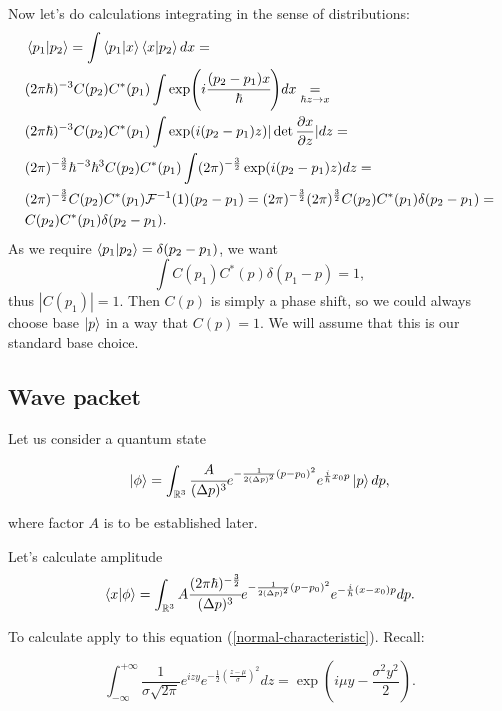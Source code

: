 \documentclass[main.tex]{subfiles}
\begin{document}
Now let's do calculations integrating in the sense of distributions:
\begin{align*}
& \bra{p_1}\ket{p_2} = \int\bra{p_1} \ket{x}\bra{x} \ket{p_2} dx = \\
& (2\pi\hbar)^{-3} C(p_2)C^*(p_1)\int \exp(i \cfrac{(p_2 - p_1)x}{\hbar})dx \underset{\hbar z\to x}{=} \\
& (2\pi\hbar)^{-3} C(p_2)C^*(p_1) \int \exp(i(p_2 - p_1)z) |\det \frac{\partial x}{\partial z}|dz
= \\ 
&(2\pi)^{-\frac{3}{2}} \hbar^{-3} \hbar^3 C(p_2)C^*(p_1) \int (2\pi)^{-\frac{3}{2}} \exp(i(p_2 - p_1)z)dz = \\ 
&(2\pi)^{-\frac{3}{2}} C(p_2)C^*(p_1) \mathcal{F}^{-1}(1)(p_2 - p_1) = (2\pi)^{-\frac{3}{2}} (2\pi)^{\frac{3}{2}} C(p_2)C^*(p_1) \delta(p_2 - p_1) = \\
& C(p_2)C^*(p_1) \delta(p_2 - p_1).
\end{align*}
As we require $\bra{p_1}\ket{p_2} = \delta(p_2 - p_1)$, we want
\begin{equation}
\int C(p_1)C^*(p)\delta(p_1 - p) = 1,
\end{equation}
thus $|C(p_1)| = 1$. Then $C(p)$ is simply a phase shift, so we could always choose base $\ket{p}$ in a way that $C(p) = 1$. We will assume that this is our standard base choice.


\subsection{Wave packet}

Let us consider a quantum state

\begin{equation}
\ket{\phi} = \int_{\mathbb{R}^3} \cfrac{A}{(\Delta p)^3} e^{-\frac{1}{2(\Delta p)^2}(p - p_0)^2} e^{\frac{i}{\hbar}x_0 p}\ket{p} dp,
\end{equation}

where factor $A$ is to be established later. 

Let's calculate amplitude 
\begin{equation}
\bra{x}\ket{\phi} = \int_{\mathbb{R}^3} A \cfrac{ (2\pi\hbar)^{-\frac{3}{2}}}{(\Delta p)^3} e^{-\frac{1}{2(\Delta p)^2}(p - p_0)^2} e^{-\frac{i}{\hbar}(x - x_0) p} dp.
\end{equation}


To calculate apply to this equation (\ref{normal-characteristic}). Recall:

\begin{equation}
\int^{+\infty}_{-\infty} \frac{1}{\sigma \sqrt{2\pi} } e^{izy} e^{-\frac{1}{2}\left(\frac{z-\mu}{\sigma}\right)^2}dz = \exp(i\mu y - \frac{\sigma^2 y^2}{2}).
\end{equation}
\end{document}
